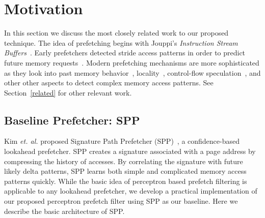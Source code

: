 \section{Motivation}
\label{Background}

In this section we discuss the most closely related work to our
proposed technique.  The idea of prefetching begins with Jouppi's
\textit{Instruction Stream Buffers}~\cite{ISB}. Early prefetchers
detected stride access patterns in order to predict future memory
requests~\cite{Smith,Baer,Stride}. Modern prefetching mechanisms are
more sophisticated as they look into past memory
behavior~\cite{Address_Correlated,AMPM},
locality~\cite{Spatial_Pattern,SMS,Temporal_Instruction_Fetch,Off_Chip,STMS,SMS_JILP},
control-flow speculation~\cite{BFetch,MTBFetch}, and other other
aspects to detect complex memory access patterns.  See
Section~\ref{related} for other relevant work.


\subsection{Baseline Prefetcher: SPP}
\label{Background-SPP}

Kim {\em et. al.} proposed Signature Path Prefetcher (SPP)~\cite{SPP},
a confidence-based lookahead prefetcher.  SPP creates a signature
associated with a page address by compressing the history of
accesses. By correlating the signature with future likely delta
patterns, SPP learns both simple and complicated memory access
patterns quickly.  While the basic idea of perceptron based prefetch
filtering is applicable to any lookahead prefetcher, we develop a
practical implementation of our proposed perceptron prefetch filter
using SPP as our baseline.  Here we describe the basic architecture of
SPP.

